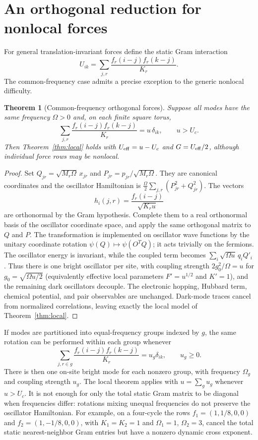 \documentclass[11pt]{article}
\newtheorem{theorem}{Theorem}
\begin{document}
\section{An orthogonal reduction for nonlocal forces}
For general translation-invariant forces define the static Gram interaction
\[
 U_{ik}=\sum_{j,r}\frac{f_r(i-j)f_r(k-j)}{K_r}.
\]
The common-frequency case admits a precise exception to the generic nonlocal difficulty.

\begin{theorem}[Common-frequency orthogonal forces]\label{thm:orthogonal}
Suppose all modes have the same frequency $\Omega>0$ and, on each finite square torus,
\[
 \sum_{j,r}\frac{f_r(i-j)f_r(k-j)}{K_r}=u\,\delta_{ik},\qquad u>U_c.
\]
Then Theorem~\ref{thm:local} holds with $U_{\rm eff}=u-U_c$ and $G=U_{\rm eff}/2$, although individual force rows may be nonlocal.
\end{theorem}

\begin{proof}
Set $Q_{jr}=\sqrt{M_r\Omega}\,x_{jr}$ and $P_{jr}=p_{jr}/\sqrt{M_r\Omega}$. They are canonical coordinates and the oscillator Hamiltonian is $\frac{\Omega}{2}\sum_{j,r}(P_{jr}^2+Q_{jr}^2)$. The vectors
\[
 h_i(j,r)=\frac{f_r(i-j)}{\sqrt{K_ru}}
\]
are orthonormal by the Gram hypothesis. Complete them to a real orthonormal basis of the oscillator coordinate space, and apply the same orthogonal matrix to $Q$ and $P$. The transformation is implemented on oscillator wave functions by the unitary coordinate rotation $\psi(Q)\mapsto\psi(O^TQ)$; it acts trivially on the fermions. The oscillator energy is invariant, while the coupled term becomes $\sum_i\sqrt{\Omega u}\,q_iQ'_i$. Thus there is one bright oscillator per site, with coupling strength $2g_0^2/\Omega=u$ for $g_0=\sqrt{\Omega u/2}$ (equivalently effective local parameters $F'=u^{1/2}$ and $K'=1$), and the remaining dark oscillators decouple. The electronic hopping, Hubbard term, chemical potential, and pair observables are unchanged. Dark-mode traces cancel from normalized correlations, leaving exactly the local model of Theorem~\ref{thm:local}.
\end{proof}

If modes are partitioned into equal-frequency groups indexed by $g$, the same rotation can be performed within each group whenever
\[
 \sum_{j,r\in g}\frac{f_r(i-j)f_r(k-j)}{K_r}=u_g\delta_{ik},\qquad u_g\ge0.
\]
There is then one on-site bright mode for each nonzero group, with frequency $\Omega_g$ and coupling strength $u_g$. The local theorem applies with $u=\sum_g u_g$ whenever $u>U_c$. It is not enough for only the total static Gram matrix to be diagonal when frequencies differ: rotations mixing unequal frequencies do not preserve the oscillator Hamiltonian. For example, on a four-cycle the rows $f_1=(1,1/8,0,0)$ and $f_2=(1,-1/8,0,0)$, with $K_1=K_2=1$ and $\Omega_1=1$, $\Omega_2=3$, cancel the total static nearest-neighbor Gram entries but have a nonzero dynamic cross exponent.
\end{document}
